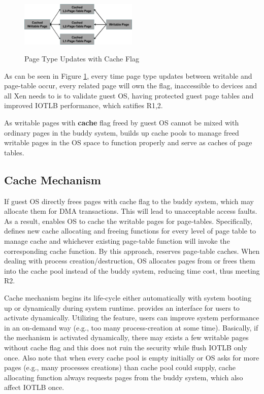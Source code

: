\begin{figure}[ht]
\centering
\includegraphics[width=0.5\textwidth]{image/overview/page-type-updates-with-cache-flag.png} \\
\caption{Page Type Updates with Cache Flag}
\label{fig:cache-flag}
\end{figure}

As can be seen in Figure \ref{fig:cache-flag}, every time page type updates between writable and page-table occur, every related page will own the flag, inaccessible to devices and all Xen needs to is to validate guest OS, having protected guest page tables and improved IOTLB performance, which satifies R1,2.

As writable pages with \textbf{cache} flag freed by guest OS cannot be mixed with ordinary pages in the buddy system, \name builds up cache pools to manage freed writable pages in the OS space to function properly and serve as caches of page tables.

\subsection{Cache Mechanism}
If guest OS directly frees pages with cache flag to the buddy system, which may allocate them for DMA transactions. This will lead to unacceptable access faults. As a result, \name enables OS to cache the writable pages for page-tables. Specifically, \name defines new cache allocating and freeing functions for every level of page table to manage cache and whichever existing page-table function will invoke the corresponding cache function. By this approach, \name reserves page-table caches. When dealing with process creation/destruction, OS allocates pages from or frees them into the cache pool instead of the buddy system, reducing time cost, thus meeting R2.

Cache mechanism begins its life-cycle either automatically with system booting up or dynamically during system runtime. \name provides an interface for users to activate dynamically. Utilizing the feature, users can improve system performance in an on-demand way (e.g., too many process-creation at some time). Basically, if the mechanism is activated dynamically, there may exists a few writable pages without cache flag and this does not ruin the security while flush IOTLB only once. Also note that when every cache pool is empty initially or OS asks for more pages (e.g., many processes creations) than cache pool could supply, cache allocating function always requests pages from the buddy system, which also affect IOTLB once.

